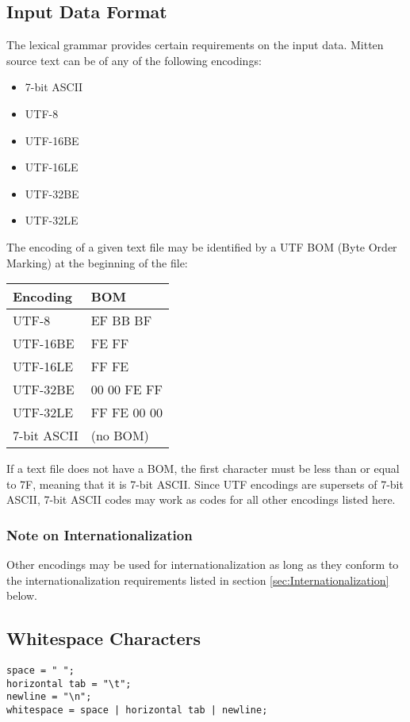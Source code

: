 \documentclass[10pt,a4paper]{article}
\begin{document}
\subsection{Input Data Format}
The lexical grammar provides certain requirements on the input data. Mitten source text can be of any of the following encodings:
\begin{itemize}
\item 7-bit ASCII
\item UTF-8
\item UTF-16BE
\item UTF-16LE
\item UTF-32BE
\item UTF-32LE
\end{itemize}

The encoding of a given text file may be identified by a UTF BOM (Byte Order Marking) at the beginning of the file:
\begin{tabular}{|l|l|}
\hline
\textbf{Encoding} & \textbf{BOM} \\
\hline
UTF-8 & EF BB BF \\
\hline
UTF-16BE & FE FF \\
\hline
UTF-16LE & FF FE \\
\hline
UTF-32BE & 00 00 FE FF \\
\hline
UTF-32LE & FF FE 00 00 \\
\hline
7-bit ASCII & (no BOM) \\
\hline
\end{tabular}

If a text file does not have a BOM, the first character must be less than or equal to 7F, meaning that it is 7-bit ASCII. Since UTF encodings are supersets of 7-bit ASCII, 7-bit ASCII codes may work as codes for all other encodings listed here.

\subsubsection{Note on Internationalization}
Other encodings may be used for internationalization as long as they conform to the internationalization requirements listed in section \ref{sec:Internationalization} below.

\subsection{Whitespace Characters}
\begin{verbatim}
space = " ";
horizontal tab = "\t";
newline = "\n";
whitespace = space | horizontal tab | newline;
\end{verbatim}
\end{document}
